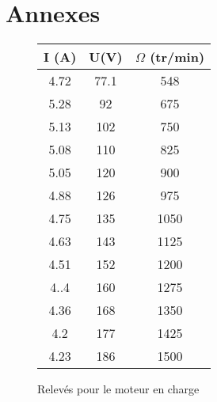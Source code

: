 \documentclass[oneside,a4paper,12pt]{article}
\begin{document}
	\newpage
	\section{Annexes}
	\begin{figure}[h]
		\begin{center}
			\begin{tabular}{|c|c|c|}
				\hline
				I (A) & U(V) & $\Omega$ (tr/min)\\
				\hline
				4.72 & 77.1 & 548\\
				\hline
				5.28 & 92 & 675\\
				\hline
				5.13 & 102 & 750\\
				\hline
				5.08 & 110 & 825\\
				\hline
				5.05 & 120 & 900\\
				\hline
				4.88 & 126 & 975\\
				\hline
				4.75 & 135 & 1050\\
				\hline
				4.63 & 143 & 1125\\
				\hline
				4.51 & 152 & 1200\\
				\hline
				4..4 & 160 & 1275\\
				\hline
				4.36 & 168 & 1350\\
				\hline
				4.2 & 177 & 1425\\
				\hline
				4.23 & 186 & 1500\\
				\hline
			\end{tabular}
		\end{center}
	\caption{Relevés pour le moteur en charge}
	\end{figure}
	
	
	
\end{document}
